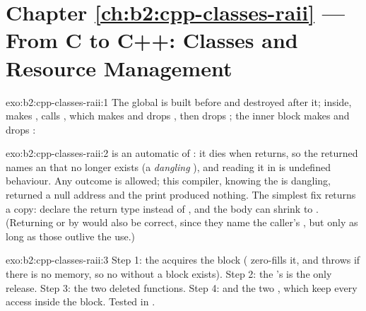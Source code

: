 \section*{Chapter \ref{ch:b2:cpp-classes-raii} --- From C to C++: Classes and Resource Management}

\begin{solution}{exo:b2:cpp-classes-raii:1}
The global  is built before  and destroyed after it; inside,  makes , calls
, which makes and drops , then drops ; the inner block makes and drops :
\end{solution}

\begin{solution}{exo:b2:cpp-classes-raii:2}
 is an automatic  of : it dies when  returns, so the returned 
names an  that no longer exists (a \emph{dangling} ), and reading it in  is undefined
behaviour. Any outcome is allowed; this compiler, knowing the  is dangling, returned a null address and the
print produced nothing. The simplest fix returns a copy: declare the return type  instead of
, and the body can shrink to . (Returning  or  by  would also be
correct, since they name the caller's , but only as long as those outlive the use.)
\end{solution}

\begin{solution}{exo:b2:cpp-classes-raii:3}
Step 1: the  acquires the block ( zero-fills it, and throws  if
there is no memory, so no  without a block exists). Step 2: the 's  is the only
release. Step 3: the two deleted functions. Step 4:  and the two , which keep every access inside
the block. Tested in .
\end{solution}


